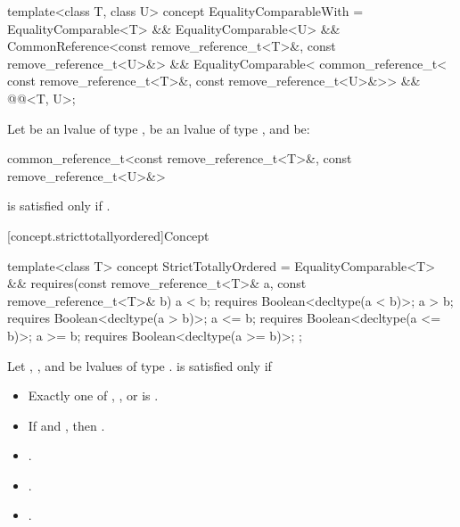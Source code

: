 %
\begin{itemdecl}
template<class T, class U>
concept EqualityComparableWith =
  EqualityComparable<T> && EqualityComparable<U> &&
  CommonReference<const remove_reference_t<T>&, const remove_reference_t<U>&> &&
  EqualityComparable<
    common_reference_t<
      const remove_reference_t<T>&,
      const remove_reference_t<U>&>> &&
  @@<T, U>;
\end{itemdecl}

\begin{itemdescr}
\pnum
Let  be an lvalue of type ,
 be an lvalue of type ,
and  be:
\begin{codeblock}
common_reference_t<const remove_reference_t<T>&, const remove_reference_t<U>&>
\end{codeblock}
 is satisfied only if
.
\end{itemdescr}

[concept.stricttotallyordered]{Concept }

%
\begin{itemdecl}
template<class T>
concept StrictTotallyOrdered = EqualityComparable<T> &&
  requires(const remove_reference_t<T>& a,
           const remove_reference_t<T>& b) {
    a <  b; requires Boolean<decltype(a <  b)>;
    a >  b; requires Boolean<decltype(a >  b)>;
    a <= b; requires Boolean<decltype(a <= b)>;
    a >= b; requires Boolean<decltype(a >= b)>;
  };
\end{itemdecl}

\begin{itemdescr}
\pnum
Let , , and  be lvalues of type
.
 is satisfied only if

\begin{itemize}
\item Exactly one of , , or
       is .
\item If  and , then
      .
\item {}.
\item {}.
\item {}.
\end{itemize}

\end{itemdescr}

